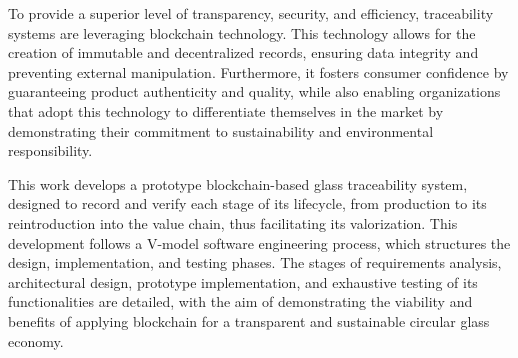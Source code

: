 To provide a superior level of transparency, security, and efficiency, traceability systems are leveraging blockchain technology. This technology allows for the creation of immutable and decentralized records, ensuring data integrity and preventing external manipulation. Furthermore, it fosters consumer confidence by guaranteeing product authenticity and quality, while also enabling organizations that adopt this technology to differentiate themselves in the market by demonstrating their commitment to sustainability and environmental responsibility.

This work develops a prototype blockchain-based glass traceability system, designed to record and verify each stage of its lifecycle, from production to its reintroduction into the value chain, thus facilitating its valorization. This development follows a V-model software engineering process, which structures the design, implementation, and testing phases. The stages of requirements analysis, architectural design, prototype implementation, and exhaustive testing of its functionalities are detailed, with the aim of demonstrating the viability and benefits of applying blockchain for a transparent and sustainable circular glass economy.
